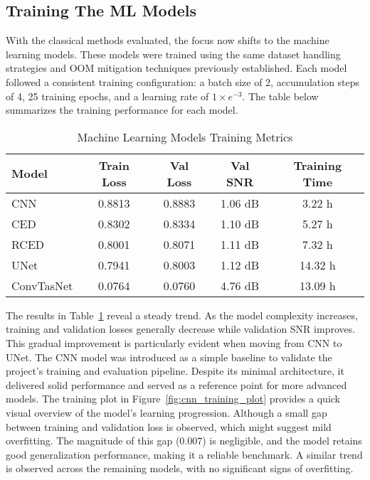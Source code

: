 \subsection{Training The ML Models}
\label{sec:training_ml_models}

With the classical methods evaluated, the focus now shifts to the machine learning models. These models were trained using the same dataset handling strategies and OOM mitigation techniques previously established. Each model followed a consistent training configuration: a batch size of 2, accumulation steps of 4, 25 training epochs, and a learning rate of $1 \times e^{-3}$. The table below summarizes the training performance for each model.

\vspace{1em}
\begin{table}[H]
\centering
\caption{Machine Learning Models Training Metrics}
\label{tab:ml_training}
\begin{tabular}{|l|c|c|c|c|}
\hline
\textbf{Model} & \textbf{Train Loss} & \textbf{Val Loss} & \textbf{Val SNR} & \textbf{Training Time} \\
\hline
CNN         & 0.8813 & 0.8883 & 1.06 dB & 3.22 h \\
CED         & 0.8302 & 0.8334 & 1.10 dB & 5.27 h \\
RCED        & 0.8001 & 0.8071 & 1.11 dB & 7.32 h \\
UNet        & 0.7941 & 0.8003 & 1.12 dB & 14.32 h \\
ConvTasNet  & 0.0764 & 0.0760 & 4.76 dB & 13.09 h \\
\hline
\end{tabular}
\end{table}

The results in Table~\ref{tab:ml_training} reveal a steady trend. As the model complexity increases, training and validation losses generally decrease while validation SNR improves. This gradual improvement is particularly evident when moving from CNN to UNet. The CNN model was introduced as a simple baseline to validate the project’s training and evaluation pipeline. Despite its minimal architecture, it delivered solid performance and served as a reference point for more advanced models. The training plot in Figure~\ref{fig:cnn_training_plot} provides a quick visual overview of the model's learning progression. Although a small gap between training and validation loss is observed, which might suggest mild overfitting. The magnitude of this gap (0.007) is negligible, and the model retains good generalization performance, making it a reliable benchmark. A similar trend is observed across the remaining models, with no significant signs of overfitting.

